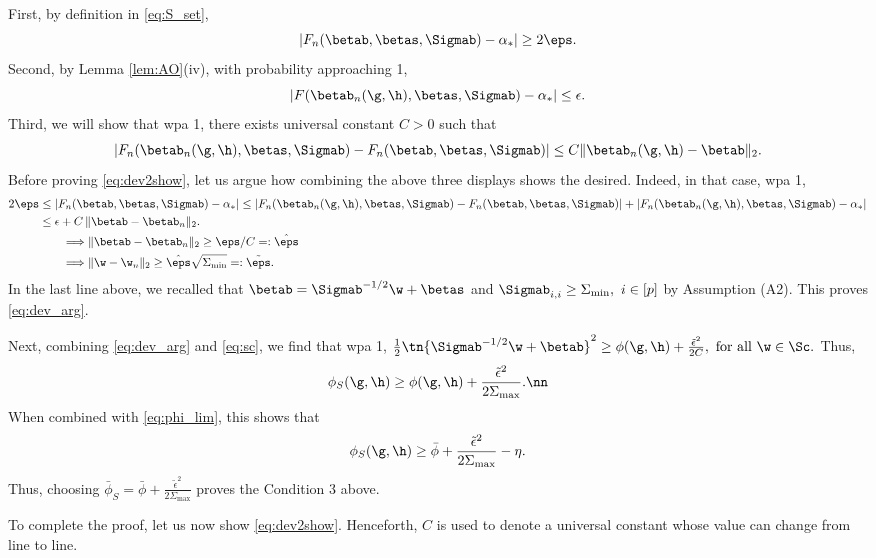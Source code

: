 \noindent First, by definition in \eqref{eq:S_set},
$$
|F_n(\betab,\betas,\Sigmab)-\alpha_*| \geq 2\eps.
$$
Second, by Lemma \ref{lem:AO}(iv), with probability approaching 1,
$$
|F(\betab_n(\g,\h),\betas,\Sigmab) - \alpha_*| \leq \epsilon.
$$
Third, we will show that wpa 1, there exists universal constant $C>0$ such that
\begin{align}
|F_n(\betab_n(\g,\h),\betas,\Sigmab) - F_n(\betab,\betas,\Sigmab)| \leq C {\|\betab_{n}(\g,\h) - \betab\|_2}\label{eq:dev2show}.
\end{align}
Before proving \eqref{eq:dev2show}, let us argue how combining the above three displays shows the desired. Indeed, in that case, wpa 1,
\begin{align*}
2\eps &\leq |F_n(\betab,\betas,\Sigmab)-\alpha_*| \leq |F_n(\betab_n(\g,\h),\betas,\Sigmab) - F_n(\betab,\betas,\Sigmab)| + |F_n(\betab_n(\g,\h),\betas,\Sigmab) - \alpha_*| \\
&\leq \epsilon + C \,\|\betab-\betab_n\|_2. \\
&\qquad\Longrightarrow \|\betab-\betab_n\|_2 \geq {\eps}/{C}=:\hat\eps\\
&\qquad\Longrightarrow \|\w-\w_n\|_2 \geq \hat\eps\sqrt{\Sigma_{\min}}=:\tilde\eps.
\end{align*}
In the last line above, we recalled that $\betab=\Sigmab^{-1/2}\w+\betas$ and $\Sigmab_{i,i}\geq\Sigma_{\min},~i\in[p]$ by Assumption (A2). This proves \eqref{eq:dev_arg}.

Next, combining \eqref{eq:dev_arg} and \eqref{eq:sc}, we find that wpa 1,
$
\frac{1}{2}\tn{\Sigmab^{-1/2}\w+\betab}^2 \geq \phi(\g,\h) + \frac{\tilde\epsilon^2}{2C},~\text{for all}~ \w\in\Sc.
$
Thus, 
\begin{align}
\phi_S(\g,\h) \geq \phi(\g,\h) + \frac{\tilde\epsilon^2}{2\Sigma_{\max}}.\nn
\end{align}
When combined with \eqref{eq:phi_lim}, this shows that
\begin{align}
\phi_S(\g,\h) \geq \bar\phi + \frac{\tilde\epsilon^2}{2\Sigma_{\max}} - \eta.
\end{align}
Thus, choosing $\bar\phi_S = \bar\phi + \frac{\tilde\epsilon^2}{2\Sigma_{\max}}$ proves the Condition 3 above. 

\vp
To complete the proof, let us now show \eqref{eq:dev2show}. Henceforth, $C$ is used to denote a universal constant whose value can change from line to line.

